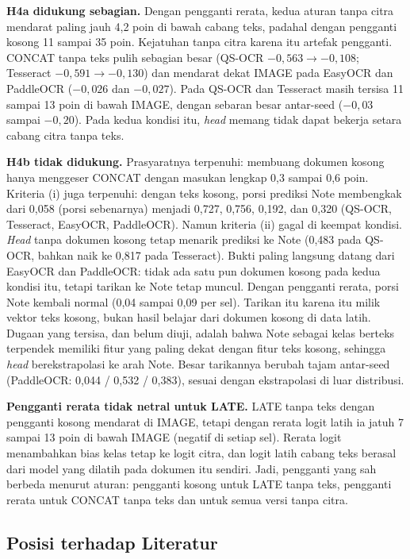 \textbf{H4a didukung sebagian.} Dengan pengganti rerata, kedua aturan tanpa citra
mendarat paling jauh 4,2 poin di bawah cabang teks, padahal dengan pengganti kosong 11
sampai 35 poin. Kejatuhan tanpa citra karena itu artefak pengganti. CONCAT tanpa teks pulih
sebagian besar (QS-OCR $-0{,}563 \rightarrow -0{,}108$; Tesseract
$-0{,}591 \rightarrow -0{,}130$) dan mendarat dekat IMAGE pada EasyOCR dan PaddleOCR
($-0{,}026$ dan $-0{,}027$). Pada QS-OCR dan Tesseract masih tersisa 11 sampai 13 poin di
bawah IMAGE, dengan sebaran besar antar-seed ($-0{,}03$ sampai $-0{,}20$). Pada kedua
kondisi itu, \textit{head} memang tidak dapat bekerja setara cabang citra tanpa teks.

\textbf{H4b tidak didukung.} Prasyaratnya terpenuhi: membuang dokumen kosong hanya
menggeser CONCAT dengan masukan lengkap 0,3 sampai 0,6 poin. Kriteria (i) juga terpenuhi:
dengan teks kosong, porsi prediksi Note membengkak dari 0,058 (porsi sebenarnya) menjadi
0,727, 0,756, 0,192, dan 0,320 (QS-OCR, Tesseract, EasyOCR, PaddleOCR). Namun kriteria (ii)
gagal di keempat kondisi. \textit{Head} tanpa dokumen kosong tetap menarik prediksi ke Note
(0,483 pada QS-OCR, bahkan naik ke 0,817 pada Tesseract). Bukti paling langsung datang
dari EasyOCR dan PaddleOCR: tidak ada satu pun dokumen kosong pada kedua kondisi itu, tetapi
tarikan ke Note tetap muncul. Dengan pengganti rerata, porsi Note kembali normal (0,04
sampai 0,09 per sel). Tarikan itu karena itu milik vektor teks kosong, bukan hasil belajar
dari dokumen kosong di data latih. Dugaan yang tersisa, dan belum diuji, adalah bahwa Note
sebagai kelas berteks terpendek memiliki fitur yang paling dekat dengan fitur teks kosong,
sehingga \textit{head} berekstrapolasi ke arah Note. Besar tarikannya berubah tajam
antar-seed (PaddleOCR: 0,044 / 0,532 / 0,383), sesuai dengan ekstrapolasi di luar
distribusi.

\textbf{Pengganti rerata tidak netral untuk LATE.} LATE tanpa teks dengan pengganti kosong
mendarat di IMAGE, tetapi dengan rerata logit latih ia jatuh 7 sampai 13 poin di bawah
IMAGE (negatif di setiap sel). Rerata logit menambahkan bias kelas tetap ke logit citra,
dan logit latih cabang teks berasal dari model yang dilatih pada dokumen itu sendiri.
Jadi, pengganti yang sah berbeda menurut aturan: pengganti kosong untuk LATE tanpa teks,
pengganti rerata untuk CONCAT tanpa teks dan untuk semua versi tanpa citra.

\subsection{Posisi terhadap Literatur}\label{sec:posisi-hasil}

